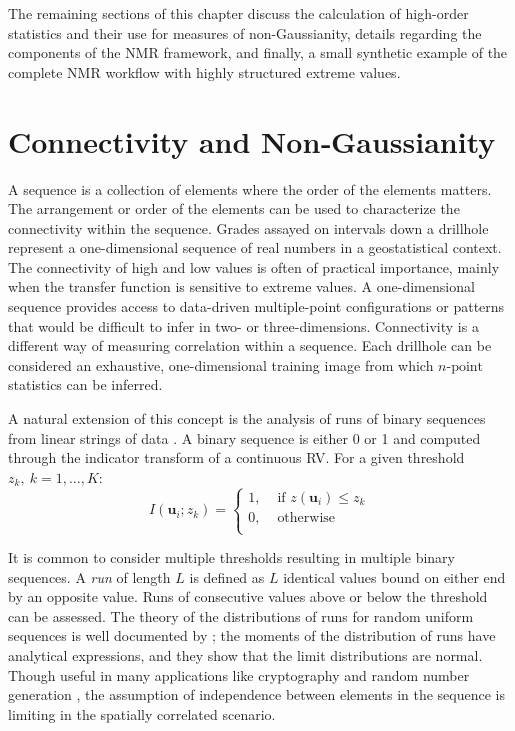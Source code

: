 The remaining sections of this chapter discuss the calculation of high-order statistics and their use for measures of non-Gaussianity, details regarding the components of the \gls{NMR} framework, and finally, a small synthetic example of the complete \gls{NMR} workflow with highly structured extreme values.


\FloatBarrier
\section{Connectivity and Non‐Gaussianity}
\label{sec:03connect}

A sequence is a collection of elements where the order of the elements matters. The arrangement or order of the elements can be used to characterize the connectivity within the sequence. Grades assayed on intervals down a drillhole represent a one-dimensional sequence of real numbers in a geostatistical context. The connectivity of high and low values is often of practical importance, mainly when the transfer function is sensitive to extreme values. A one-dimensional sequence provides access to data-driven multiple-point configurations or patterns that would be difficult to infer in two- or three-dimensions. Connectivity is a different way of measuring correlation within a sequence. Each drillhole can be considered an exhaustive, one-dimensional training image from which $n\text{-point}$ statistics can be inferred.

A natural extension of this concept is the analysis of runs of binary sequences from linear strings of data \citep{ortiz2003characterization}. A binary sequence is either 0 or 1 and computed through the indicator transform of a continuous \gls{RV}. For a given threshold $z_{k}, \ k=1,\dots,K$:
\begin{equation}
    I(\mathbf{u}_{i};z_{k}) =
    \begin{cases}
        1, & \text{ if }z(\mathbf{u}_{i}) \leq z_{k} \\
        0, & \text{ otherwise }                      \\
    \end{cases}
    \label{eq:indicator}
\end{equation}

It is common to consider multiple thresholds resulting in multiple binary sequences. A \textit{run} of length $L$ is defined as $L$ identical values bound on either end by an opposite value. Runs of consecutive values above or below the threshold can be assessed. The theory of the distributions of runs for random uniform sequences is well documented by \cite{fu2003distribution}; the moments of the distribution of runs have analytical expressions, and they show that the limit distributions are normal. Though useful in many applications like cryptography and random number generation \citep{rukhin2010statistical}, the assumption of independence between elements in the sequence is limiting in the spatially correlated scenario.

